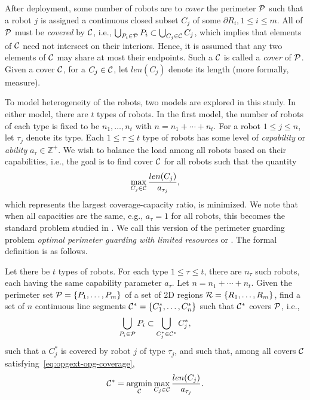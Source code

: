 After deployment, some number of robots are to {\em cover} the perimeter 
$\P$ such that a robot $j$ is assigned a continuous closed subset $C_j$ 
of some $\partial R_i, 1 \le i \le m$. All of $\P$ must be {\em covered} 
by $\C$, i.e., 
%
$\bigcup_{P_i \in \P} P_i  \subset \bigcup_{C_j \in \C} C_j$,
%
which implies that elements of $\C$ need not intersect on their interiors. 
Hence, it is assumed that any two elements of $\C$ may share at most their 
endpoints. Such a $\C$ is called a {\em cover} of $\P$. Given a cover 
$\C$, for a $C_j \in \C$, let $len(C_j)$ denote its length (more formally, 
measure). 

To model heterogeneity of the robots, two models are explored in this
study. In either model, there are $t$ types of robots. In the first model,
the number of robots of each type is fixed to be $n_1, \ldots, n_t$ with 
$n = n_1 + \cdots + n_t$. For a robot $1 \le j \le n$, let $\tau_j$ denote 
its type. Each $1 \le \tau \le t$ type of robots has some 
level of {\em capability} or {\em ability} $a_{\tau} \in \mathbb Z^+$. We 
wish to balance the load among all robots based on their capabilities, 
i.e., the goal is to find cover $\C$ for all robots such that the quantity 
\[
\max_{C_j \in \C} \frac{len(C_j)}{a_{\tau_j}},
\]
which represents the largest coverage-capacity ratio, is minimized. 
We note that when all capacities are the same, e.g., $a_{\tau} = 1$ for 
all robots, this becomes the standard \opg problem studied in \cite{FenHanGaoYu19RSS}. 
We call this version of the perimeter guarding problem {\em optimal 
	perimeter guarding with limited resources} or \opglr. The formal 
definition is as follows.

\begin{problem} Let there be $t$ types of robots. For each type $1\le \tau 
	\le t$, there are $n_{\tau}$ such robots, each having the same 
	capability parameter $a_{\tau}$. Let $n = n_1 + \cdots + n_t$. 
	Given the perimeter set $\P = \{P_1, \ldots, P_m\}$ of a set of 
	2D regions $\R =\{R_1, \ldots, R_m\}$, find a set of $n$ continuous 
	line segments $\C^* = \{C_1^*, \ldots, C_n^*\}$ such that $\C^*$ covers 
	$\P$, i.e., \begin{align}\label{eq:opgext-opg-coverage}
	\bigcup_{P_i \in \P} P_i  \subset \bigcup_{C_j^* \in \C^*} C_j^*,
	\end{align}
	such that a $C_j^*$ is covered by robot $j$ of type $\tau_j$, and such that,
	among all covers $\C$ satisfying~\eqref{eq:opgext-opg-coverage}, 
	\begin{align}\label{eq:opgext-opg-objective}
	\C^* = \underset{\C}{\mathrm{argmin}} \max_{C_j \in \C} 
	\frac{len(C_j)}{a_{\tau_j}}.
	\end{align}
\end{problem}

